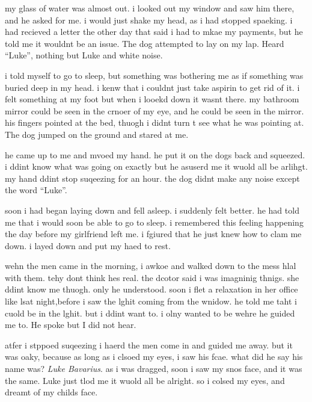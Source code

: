 my glass of water was almost out. i looked out my window and saw
him there, and he asked for me. i would just shake my head, as i
had stopped spaeking. i had recieved a letter the other day that
said i had to mkae my payments, but he told me it wouldnt be an
issue. The dog attempted to lay on my lap. Heard ``Luke'', nothing
but Luke and white noise.



i told myself to go to sleep, but something was bothering me as if
something was buried deep in my head. i kenw that i couldnt just
take aspirin to get rid of it. i felt something at my foot but when
i looekd down it wasnt there. my bathroom mirror could be seen in
the crnoer of my eye, and he could be seen in the mirror. his
fingers pointed at the bed, thuogh i didnt turn t see what he was
pointing at. The dog jumped on the ground and stared at me.



he came up to me and mvoed my hand. he put it on the dogs back and
squeezed. i ddint know what was going on exactly but he asuserd me
it wuold all be arlihgt. my hand ddint stop suqeezing for an hour.
the dog didnt make any noise except the word ``Luke''.



soon i had began laying down and fell asleep. i suddenly felt
better. he had told me that i would soon be able to go to sleep. i
remembered this feeling happening the day before my girlfriend left
me. i fgiured that he just knew how to clam me down. i layed down
and put my haed to rest.



wehn the men came in the morning, i awkoe and walked down to the
mess hlal with them. tehy dont think hes real. the dcotor said i
was imagninig thnigs. she ddint know me thuogh. only he understood.
soon i flet a relaxation in her office like lsat night,before i saw
the lghit coming from the wnidow. he told me taht i cuold be in the
lghit. but i ddint want to. i olny wanted to be wehre he guided me
to. He spoke but I did not hear.



atfer i stppoed suqeezing i haerd the men come in and guided me
away. but it was oaky, because as long as i clsoed my eyes, i saw
his fcae. what did he say his name was? {\em Luke Bavarius}. as i
was dragged, soon i saw my snos face, and it was the same. Luke
just tlod me it wuold all be alright. so i colsed my eyes, and
dreamt of my childs face.





